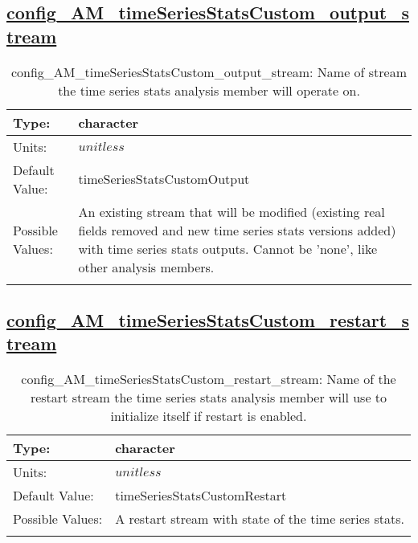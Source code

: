 \subsection[config\_AM\_timeSeriesStatsCustom\_output\_stream]{\hyperref[sec:nm_tab_AM_timeSeriesStatsCustom]{config\_AM\_timeSeriesStatsCustom\_output\_stream}}
\label{subsec:nm_sec_config_AM_timeSeriesStatsCustom_output_stream}
\begin{center}
\begin{longtable}{| p{2.0in} || p{4.0in} |}
    \hline
    Type: & character \\
    \hline
    Units: & $unitless$ \\
    \hline
    Default Value: & timeSeriesStatsCustomOutput \\
    \hline
    Possible Values: & An existing stream that will be modified (existing real fields removed and new time series stats versions added) with time series stats outputs. Cannot be 'none', like other analysis members. \\
    \hline
    \caption{config\_AM\_timeSeriesStatsCustom\_output\_stream: Name of stream the time series stats analysis member will operate on.}
\end{longtable}
\end{center}
\subsection[config\_AM\_timeSeriesStatsCustom\_restart\_stream]{\hyperref[sec:nm_tab_AM_timeSeriesStatsCustom]{config\_AM\_timeSeriesStatsCustom\_restart\_stream}}
\label{subsec:nm_sec_config_AM_timeSeriesStatsCustom_restart_stream}
\begin{center}
\begin{longtable}{| p{2.0in} || p{4.0in} |}
    \hline
    Type: & character \\
    \hline
    Units: & $unitless$ \\
    \hline
    Default Value: & timeSeriesStatsCustomRestart \\
    \hline
    Possible Values: & A restart stream with state of the time series stats. \\
    \hline
    \caption{config\_AM\_timeSeriesStatsCustom\_restart\_stream: Name of the restart stream the time series stats analysis member will use to initialize itself if restart is enabled.}
\end{longtable}
\end{center}
